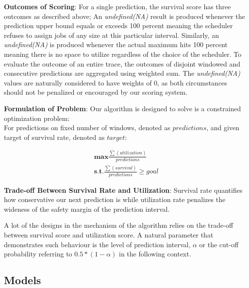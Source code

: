 \documentclass{article}
\begin{document}
\begin{flushleft}
\textbf{Outcomes of Scoring}: For a single prediction, the survival score has three outcomes as described above; An \textit{undefined(NA)} result is produced whenever the prediction upper bound equals or exceeds 100 percent meaning the scheduler refuses to assign jobs of any size at this particular interval. Similarly, an \textit{undefined(NA)} is produced whenever the actual maximum hits 100 percent meaning there is no space to utilize regardless of the choice of the scheduler. To evaluate the outcome of an entire trace, the outcomes of disjoint windowed and consecutive predictions are aggregated using weighted sum. The \textit{undefined(NA)} values are naturally considered to have weights of 0, as both circumstances should not be penalized or encouraged by our scoring system.
\end{flushleft}

\begin{flushleft}
\textbf{Formulation of Problem}: Our algorithm is designed to solve is a constrained optimization problem: \\
For predictions on fixed number of windows, denoted as $predictions$, and given target of survival rate, denoted as $target$:

\begin{equation*}\label{eq:pareto mle2}
  \begin{multlined}
    \mathbf{max}  \frac{\sum(utilization)}{predictions} \\
    \mathbf{s.t.} \frac{\sum(survival)}{predictions} \geq goal
 \end{multlined}
\end{equation*}
\end{flushleft}

\begin{flushleft}
\textbf{Trade-off Between Survival Rate and Utilization}:
Survival rate quantifies how conservative our next prediction is while utilization rate penalizes the wideness of the safety margin of the prediction interval.

A lot of the designs in the mechanism of the algorithm relies on the trade-off between survival score and utilization score. A natural parameter that demonstrates such behaviour is the level of prediction interval, $\alpha$ or the cut-off probability referring to $0.5 * (1 - \alpha)$ in the following context.
\end{flushleft}

\subsection{Models}
\end{document}
